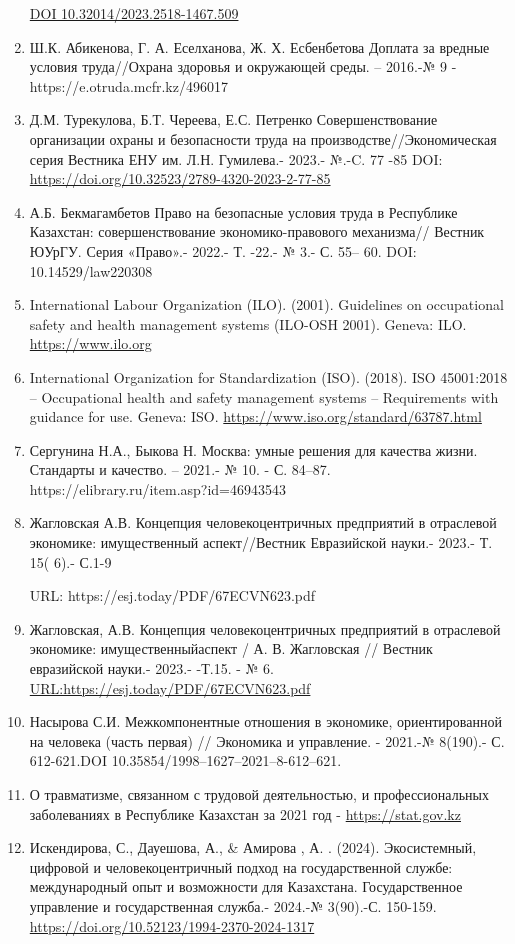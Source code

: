 \begin{references}
\begin{enumerate}
  \href{https://doi.org/10.32014/2023.2518-1467.509}{DOI
  10.32014/2023.2518-1467.509}
\item
  Ш.К. Абикенова, Г. А. Еселханова, Ж. Х. Есбенбетова Доплата за вредные
  условия труда//Охрана здоровья и окружающей среды. -- 2016.-№ 9 -
  https://e.otruda.mcfr.kz/496017
\item
  Д.М. Турекулова, Б.Т. Череева, Е.С. Петренко Совершенствование
  организации охраны и безопасности труда на производстве//Экономическая
  серия Вестника ЕНУ им. Л.Н. Гумилева.- 2023.- №.-C. 77 -85 DOI:
  \url{https://doi.org/10.32523/2789-4320-2023-2-77-85}
\item
  А.Б. Бекмагамбетов Право на безопасные условия труда в Республике
  Казахстан: совершенствование экономико-правового механизма// Вестник
  ЮУрГУ. Серия «Право».- 2022.- Т. -22.- № 3.- С. 55-- 60. DOI:
  10.14529/law220308
\item
  International Labour Organization (ILO). (2001). Guidelines on
  occupational safety and health management systems (ILO-OSH 2001).
  Geneva: ILO. \href{https://www.ilo.org/global/topics/safety-and-health-at-work/WCMS\_107727/lang-\/-en/index.htm}{https://www.ilo.org}
\item
  International Organization for Standardization (ISO). (2018). ISO
  45001:2018 -- Occupational health and safety management systems --
  Requirements with guidance for use. Geneva: ISO.
  \url{https://www.iso.org/standard/63787.html}
\item
  Сергунина Н.А., Быкова Н. Москва: умные решения для качества жизни.
  Стандарты и качество. -- 2021.- № 10. - С. 84--87.
  https://elibrary.ru/item.asp?id=46943543
\item
  Жагловская А.В. Концепция человекоцентричных предприятий в отраслевой
  экономике: имущественный аспект//Вестник Евразийской науки.- 2023.- Т.
  15( 6).- С.1-9 
  
  URL: https://esj.today/PDF/67ECVN623.pdf
\item
  Жагловская, А.В. Концепция человекоцентричных предприятий в отраслевой
  экономике: имущественныйаспект / А. В. Жагловская // Вестник
  евразийской науки.- 2023.- -Т.15. - № 6.
  \url{URL:https://esj.today/PDF/67ECVN623.pdf}
\item
  Насырова С.И. Межкомпонентные отношения в экономике, ориентированной
  на человека (часть первая) // Экономика и управление. - 2021.-№
  8(190).- С. 612-621.DOI 10.35854/1998--1627--2021--8-612--621.
\item
  О травматизме, связанном с трудовой деятельностью, и профессиональных
  заболеваниях в Республике Казахстан за 2021 год -
  \href{https://stat.gov.kz/ru/industries/social-statistics/stat-medicine/publications/3965/}{https://stat.gov.kz}
\item
  Искендирова, С., Дауешова, А., \& Амирова , А. . (2024). Экосистемный,
  цифровой и человекоцентричный подход на государственной службе:
  международный опыт и возможности для Казахстана. Государственное
  управление и государственная служба.- 2024.-№ 3(90).-С. 150-159.
  \url{https://doi.org/10.52123/1994-2370-2024-1317}
\end{enumerate}
\end{references}
